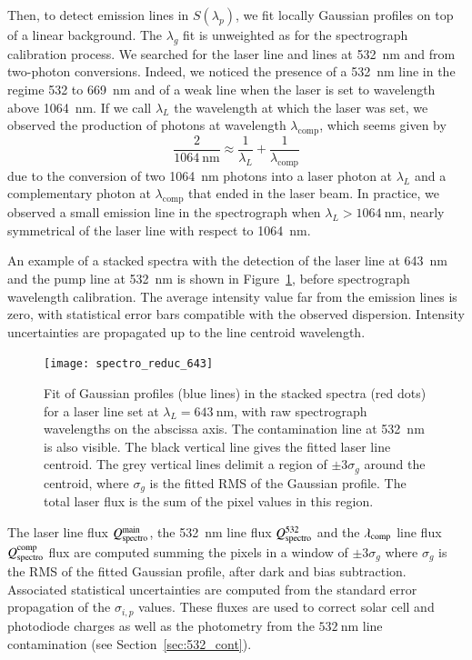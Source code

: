 Then, to detect emission lines in $S(\lambda_p)$, we fit locally Gaussian profiles on top of a linear background. The $\lambda_g$ fit is unweighted as for the spectrograph calibration process. We searched for the laser line and lines at \SI{532}{\nm} and from two-photon conversions. Indeed, we noticed the presence of a \SI{532}{\nm} line in the regime 532 to \SI{669}{\nm} and of a weak line when the laser is set to wavelength above \SI{1064}{\nm}. If we call $\lambda_L$ the wavelength at which the laser was set, we observed the production of photons at wavelength $\lambda_{\text{comp}}$, which seems given by
\begin{equation}
 \frac{2}{\SI{1064}{\nm}} \approx \frac{1}{\lambda_L} + \frac{1}{\lambda_{\text{comp}}}
 \end{equation} 
due to the conversion of two \SI{1064}{\nm} photons into a laser photon at $\lambda_L$ and a complementary photon at $\lambda_{\text{comp}}$ that ended in the laser beam. In practice, we observed a small emission line in the spectrograph when $\lambda_L > \SI{1064}{\nm}$, nearly symmetrical of the laser line with respect to \SI{1064}{\nm}. 

An example of a stacked spectra with the detection of the laser line at \SI{643}{\nm} and the pump line at \SI{532}{\nm} is shown in Figure~\ref{fig:spectro_reduc_643}, before spectrograph wavelength calibration. The average intensity value far from the emission lines is zero, with statistical error bars compatible with the observed dispersion. Intensity uncertainties are propagated up to the line centroid wavelength. 

\begin{figure}[!h]
\centering
\texttt{[image: spectro\_reduc\_643]}
\caption{Fit of Gaussian profiles (blue lines) in the stacked spectra (red dots) for a laser line set at $\lambda_L=\SI{643}{\nm}$, with raw spectrograph wavelengths on the abscissa axis. The contamination line at \SI{532}{nm} is also visible. The black vertical line gives the fitted laser line centroid. The grey vertical lines delimit a region of $\pm 3\sigma_g$ around the centroid, where $\sigma_g$ is the fitted RMS of the Gaussian profile. The total laser flux is the sum of the pixel values in this region.}\label{fig:spectro_reduc_643}
\end{figure}


The laser line flux $Q_{\mathrm{spectro}}^{\mathrm{main}}$, the \SI{532}{\nm} line flux $Q_{\mathrm{spectro}}^{532}$ and the $\lambda_{\rm comp}$ line flux $Q_{\mathrm{spectro}}^{\rm comp}$ flux are computed summing the pixels in a window of $\pm 3 \sigma_g$ where $\sigma_g$ is the RMS of the fitted Gaussian profile, after dark and bias subtraction. Associated statistical uncertainties are computed from the standard error propagation of the $\sigma_{i,p}$ values. These fluxes are used to correct solar cell and photodiode charges as well as the \SD photometry from the $\SI{532}{\nm}$ line contamination (see Section~\ref{sec:532_cont}).  %



